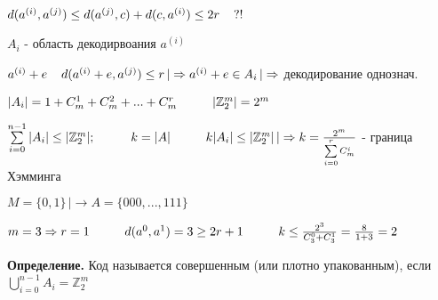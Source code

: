 \documentclass[12pt]{article}
\begin{document}
    $ $\par
    $d(a^{(i)},a^{(j)}) \leq d(a^{(j)},c) + d(c,a^{(i)}) \leq 2r \hspace{4 mm} ?!$\par
    $A_i$ - область декодирвоания $a^{(i)}$\par
    $a^{(i)}+e \hspace{4 mm} d(a^{(i)}+e, a^{(j)}) \leq r \, | \Rightarrow a^{(i)}+e \in A_i \, | \Rightarrow$ декодирование однознач.\par
    $|A_i| = 1 + C_m^1 + C_m^2 + ... + C_m^r \hspace{1 cm} |\mathbb{Z}_2^m| = 2^m$\par
    $\sum\limits_{i=0}^{n-1}|A_i| \leq |\mathbb{Z}_2^m|; \hspace{1 cm} k = |A| \hspace{1 cm} k|A_i| \leq |\mathbb{Z}_2^m| \, |\Rightarrow k = \frac{2^m}{\sum\limits_{i=0}^{r} C_m^i}$ - граница Хэмминга\par
    $M = \{ 0, 1 \} \, |\to A = \{ 000,...,111 \}$\par
    $m = 3 \Rightarrow r = 1 \hspace{1 cm} d(a^0, a^1)=3 \geq 2r+1 \hspace{1 cm} k \leq \frac{2^3}{C_3^0 + C_3^1} = \frac{8}{1+3} = 2$\par
    \textbf{Определение.} Код называется совершенным (или плотно упакованным), если $\bigcup\limits_{i=0}^{n-1}A_i = \mathbb{Z}_2^m$\par
\end{document}
